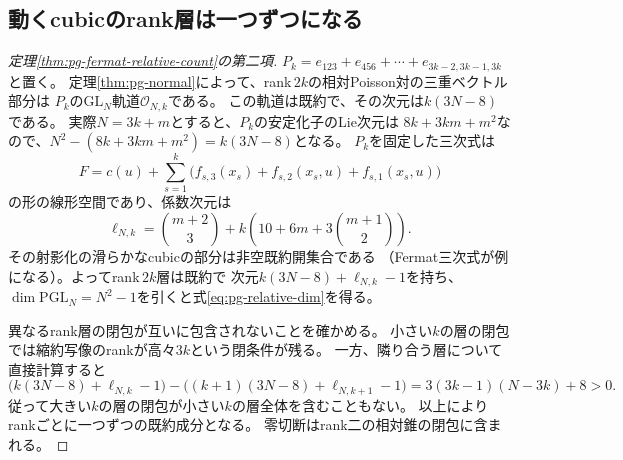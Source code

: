 \subsection{動くcubicのrank層は一つずつになる}
\begin{proof}[定理\ref{thm:pg-fermat-relative-count}の第二項]
$P_k=e_{123}+e_{456}+\cdots+e_{3k-2,3k-1,3k}$と置く。
定理\ref{thm:pg-normal}によって、rank$\,2k$の相対Poisson対の三重ベクトル部分は
$P_k$の$\mathrm{GL}_N$軌道$\mathcal O_{N,k}$である。
この軌道は既約で、その次元は$k(3N-8)$である。
実際$N=3k+m$とすると、$P_k$の安定化子のLie次元は
$8k+3km+m^2$なので、$N^2-(8k+3km+m^2)=k(3N-8)$となる。
$P_k$を固定した三次式は
\[
 F=c(u)+\sum_{s=1}^k\bigl(f_{s,3}(x_s)+f_{s,2}(x_s,u)+f_{s,1}(x_s,u)\bigr)
\]
の形の線形空間であり、係数次元は
\[
 \ell_{N,k}=\binom{m+2}{3}
 +k\left(10+6m+3\binom{m+1}{2}\right).
\]
その射影化の滑らかなcubicの部分は非空既約開集合である
（Fermat三次式が例になる）。よってrank$\,2k$層は既約で
次元$k(3N-8)+\ell_{N,k}-1$を持ち、
$\dim\mathrm{PGL}_N=N^2-1$を引くと式\eqref{eq:pg-relative-dim}を得る。

異なるrank層の閉包が互いに包含されないことを確かめる。
小さい$k$の層の閉包では縮約写像のrankが高々$3k$という閉条件が残る。
一方、隣り合う層について直接計算すると
\[
 \bigl(k(3N-8)+\ell_{N,k}-1\bigr)
 -\bigl((k+1)(3N-8)+\ell_{N,k+1}-1\bigr)
 =3(3k-1)(N-3k)+8>0.
\]
従って大きい$k$の層の閉包が小さい$k$の層全体を含むこともない。
以上によりrankごとに一つずつの既約成分となる。
零切断はrank二の相対錐の閉包に含まれる。
\end{proof}


